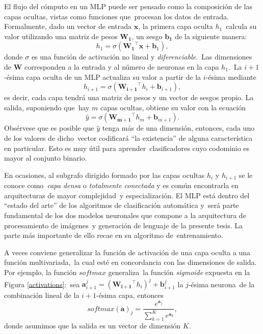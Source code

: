 El flujo del cómputo en un MLP puede ser pensado como la composición de las capas ocultas, vistas como funciones que\
procesan los datos de entrada. Formalmente, dado un vector de entrada $\mathbf{x}$, la primera capa oculta $h_1$\
calcula su valor utilizando una matriz de pesos $\mathbf{W_1}$, un sesgo $\mathbf{b_1}$ de la siguiente manera:
\begin{equation}
  h_1 = \sigma\left(\mathbf{W_1}^\top \mathbf{x} + \mathbf{b}_1\right), \label{mlpfirst}
\end{equation}
donde $\sigma$ es una función de activación no lineal y \emph{diferenciable}.\
Las dimensiones de $\mathbf{W}$ corresponden a la entrada y al número de neuronas en la capa $h_1$.\
La $i+1$-ésima capa oculta de un MLP actualiza su valor a partir de la $i$-ésima mediante
\begin{equation}
  h_{i+1} = \sigma\left(\mathbf{W_{i+1}}^\top h_i + \mathbf{b}_{i+1}\right), \label{mlphidden}
\end{equation}
es decir, cada capa tendrá una matriz de pesos y un vector de sesgos propio. La salida, suponiendo que\
hay $m$ capas ocultas, obtiene su valor con la ecuación
\begin{equation}
  \hat{y} = \sigma\left(\mathbf{W_{m+1}}^\top h_m + \mathbf{b}_{m+1}\right). \label{mlpoutput}
\end{equation}
Obsérvese que es posible que $\hat{y}$ tenga más de una dimensión, entonces, cada uno de los valores de dicho\
vector codificará ``la existencia'' de alguna característica en particular. Esto es muy útil para aprender\
clasificadores cuyo codominio es mayor al conjunto binario.\par
En ocasiones, al subgrafo dirigido formado por las capas ocultas $h_i$ y $h_{i+1}$ se le conoce como\
\emph{capa densa} o \emph{totalmente conectada} y es común encontrarla en arquitecturas de mayor complejidad\
y especialización. El MLP está dentro del ``estado del arte'' de los algoritmos de clasificación automática y\
será parte fundamental de los dos modelos neuronales que compone a la arquitectura de procesamiento de imágenes\
y generación de lenguaje de la presente tesis. La parte más importante de ello recae en su algoritmo de\
entrenamiento.\par
A veces conviene generalizar la función de activación de una capa oculta a una función multivariada,\
la cual esté en concordancia con las dimensiones de salida. Por ejemplo, la función $softmax$ generaliza\
la función \emph{sigmoide} expuesta en la Figura \ref{activations}:\
sea $\mathbf{a}_{i+1}^j = (\mathbf{W_{i+1}}^\top h_i)^j + \mathbf{b}_{i+1}^j$ la $j$-ésima neurona\
de la combinación lineal de la $i+1$-ésima capa, entonces
\begin{equation}
  softmax(\mathbf{a})_j = \frac{e^{\mathbf{a}_j}}{\sum_{k=1}^K e^{\mathbf{a}_k}},
\end{equation}
donde asumimos que la salida es un vector de dimensión $K$.


